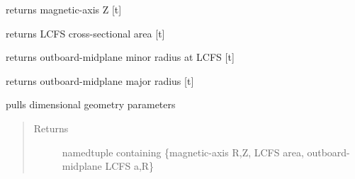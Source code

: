 \documentclass[letterpaper,10pt,english]{sphinxmanual}
\begin{document}
\begin{fulllineitems}
\begin{fulllineitems}
\end{fulllineitems}


\begin{fulllineitems}
\label{eqtools:eqtools.EFIT.EFITTree.getMagZ}
returns magnetic-axis Z {[}t{]}

\end{fulllineitems}


\begin{fulllineitems}
\label{eqtools:eqtools.EFIT.EFITTree.getAreaLCFS}
returns LCFS cross-sectional area {[}t{]}

\end{fulllineitems}


\begin{fulllineitems}
\label{eqtools:eqtools.EFIT.EFITTree.getAOut}
returns outboard-midplane minor radius at LCFS {[}t{]}

\end{fulllineitems}


\begin{fulllineitems}
\label{eqtools:eqtools.EFIT.EFITTree.getRmidOut}
returns outboard-midplane major radius {[}t{]}

\end{fulllineitems}


\begin{fulllineitems}
\label{eqtools:eqtools.EFIT.EFITTree.getGeometry}
pulls dimensional geometry parameters
\begin{quote}\begin{description}
\item[{Returns}] \leavevmode
namedtuple containing \{magnetic-axis R,Z, LCFS area, outboard-midplane LCFS a,R\}


\end{description}
\end{quote}
\end{fulllineitems}
\end{fulllineitems}
\end{document}
